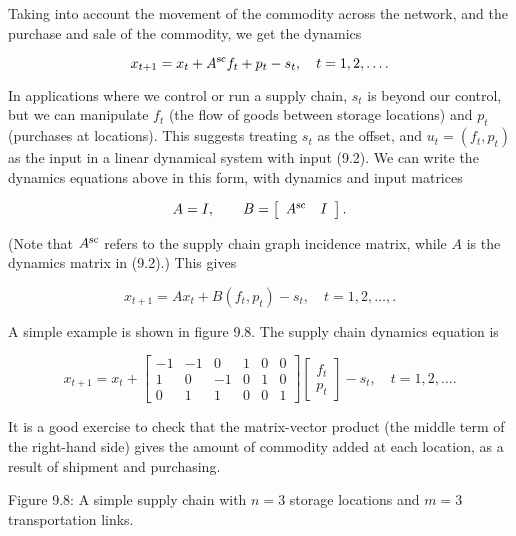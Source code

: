 Taking into account the movement of the commodity across the network, and the purchase and sale of the commodity, we get the dynamics

\[x_{t+1}=x_{t}+A^{\rm sc}f_{t}+p_{t}-s_{t},\quad t=1,2,\ldots.\]

In applications where we control or run a supply chain, \(s_{t}\) is beyond our control, but we can manipulate \(f_{t}\) (the flow of goods between storage locations) and \(p_{t}\) (purchases at locations). This suggests treating \(s_{t}\) as the offset, and \(u_{t}=(f_{t},p_{t})\) as the input in a linear dynamical system with input (9.2). We can write the dynamics equations above in this form, with dynamics and input matrices

\[A=I,\qquad B=\left[\begin{array}{cc}A^{\rm sc}&I\end{array}\right].\]

(Note that \(A^{\rm sc}\) refers to the supply chain graph incidence matrix, while \(A\) is the dynamics matrix in (9.2).) This gives

\[x_{t+1}=Ax_{t}+B(f_{t},p_{t})-s_{t},\quad t=1,2,\ldots,.\]

A simple example is shown in figure 9.8. The supply chain dynamics equation is

\[x_{t+1}=x_{t}+\left[\begin{array}{cccccc}-1&-1&0&1&0&0\\ 1&0&-1&0&1&0\\ 0&1&1&0&0&1\end{array}\right]\left[\begin{array}{c}f_{t}\\ p_{t}\end{array}\right]-s_{t},\quad t=1,2,\ldots.\]

It is a good exercise to check that the matrix-vector product (the middle term of the right-hand side) gives the amount of commodity added at each location, as a result of shipment and purchasing.

Figure 9.8: A simple supply chain with \(n=3\) storage locations and \(m=3\) transportation links.

 